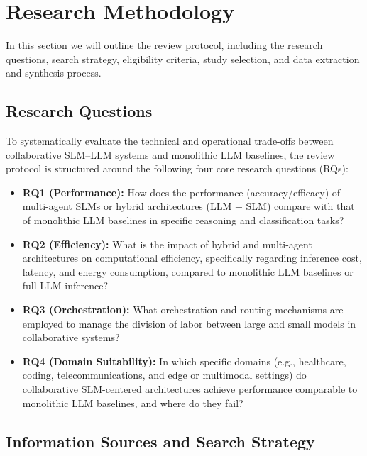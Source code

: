 \section{Research Methodology}
\label{sec:methodology}
In this section we will outline the review protocol, including the research questions, search strategy, eligibility criteria, study selection, and data extraction and synthesis process.

\subsection{Research Questions}
\label{sec:research_questions}

To systematically evaluate the technical and operational trade-offs between collaborative SLM--LLM systems and monolithic LLM baselines, the review protocol is structured around the following four core research questions (RQs):

\begin{itemize}
    \item \textbf{RQ1 (Performance):} How does the performance (accuracy/efficacy) of multi-agent SLMs or hybrid architectures (LLM + SLM) compare with that of monolithic LLM baselines in specific reasoning and classification tasks?
    
    \item \textbf{RQ2 (Efficiency):} What is the impact of hybrid and multi-agent architectures on computational efficiency, specifically regarding inference cost, latency, and energy consumption, compared to monolithic LLM baselines or full-LLM inference?
    
    \item \textbf{RQ3 (Orchestration):} What orchestration and routing mechanisms are employed to manage the division of labor between large and small models in collaborative systems?
    
    \item \textbf{RQ4 (Domain Suitability):} In which specific domains (e.g., healthcare, coding, telecommunications, and edge or multimodal settings) do collaborative SLM-centered architectures achieve performance comparable to monolithic LLM baselines, and where do they fail?
\end{itemize}

\subsection{Information Sources and Search Strategy}
\label{sec:search_strategy}

